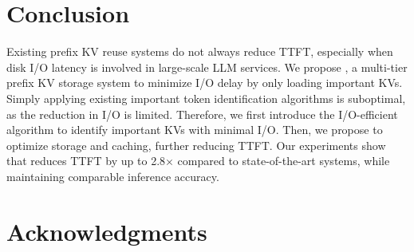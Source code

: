 \section{Conclusion}
\label{conclusion}
Existing prefix KV reuse systems do not always reduce TTFT, especially when disk
I/O latency is involved in large-scale LLM services. We propose \pname{}, a
multi-tier prefix KV storage system to 
minimize I/O delay by only loading important KVs. Simply applying existing important token identification
algorithms is suboptimal, as the reduction in I/O is limited. Therefore, we
first introduce the I/O-efficient \techa{} algorithm to identify important KVs
with minimal I/O. Then, we propose \techb{} to optimize storage and caching,
further reducing TTFT. Our experiments show that \pname{} reduces TTFT by up to
2.8$\times$ compared to state-of-the-art systems, while maintaining comparable
inference accuracy.

\section*{Acknowledgments}
